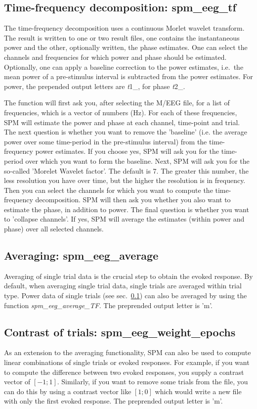 \subsection{Time-frequency decomposition: spm\_eeg\_tf}
\label{sec:tf}
The time-frequency decomposition uses a continuous
Morlet wavelet transform. The result is written to one or two result
files, one contains the instantaneous power and the other, optionally
written, the phase estimates. One can select the channels and
frequencies for which power and phase should be estimated. Optionally,
one can apply a baseline correction to the power estimates, i.e.~the
mean power of a pre-stimulus interval is subtracted from the power
estimates. For power, the prepended output letters are {\textit
  t1\_}, for phase {\textit t2\_}.

The function will first ask you, after selecting the M/EEG file, 
for a list of frequencies, which is a vector of numbers (Hz).
 For each of these frequencies, SPM will estimate the power and phase at each 
channel, time-point and trial. The next question is whether you want to remove 
the 'baseline' (i.e. the average power over some time-period in the pre-stimulus interval) 
from the time-frequency power estimates. If you choose yes, SPM will ask you for the time-period 
over which you want to form the baseline. Next, SPM will ask you for the so-called 
'Morelet Wavelet factor'. The default is 7. The greater this number, the less resolution you
 have over time, but the higher the resolution is in frequency. Then you can select the channels 
for which you want to compute the time-frequency decomposition. SPM will then ask you whether 
you also want to estimate the phase, in addition to power. The final question is whether you want
to 'collapse channels'. If yes, SPM will average the estimates (within power and phase) over all selected channels. 

\subsection{Averaging: spm\_eeg\_average}
Averaging of single trial data is the crucial step to obtain the
evoked response. By default, when averaging single trial data, single
trials are averaged within trial type. Power data of single trials
(see sec.~\ref{sec:tf}) can also be averaged by using the function
\textit{spm\_eeg\_average\_TF}. The preprended output letter is 'm'.


\subsection{Contrast of trials: spm\_eeg\_weight\_epochs}
As an extension to the averaging functionality, SPM can also be used
to compute linear combinations of single trials 
or evoked responses. For example, if you want to compute the
difference between two evoked responses, you supply a contrast vector
of $[-1; 1]$. Similarly, if you want to remove some trials from the
file, you can do this by using a contrast vector like $[1; 0]$ which
would write a new file with only the first evoked response. The
preprended output letter is 'm'. 

